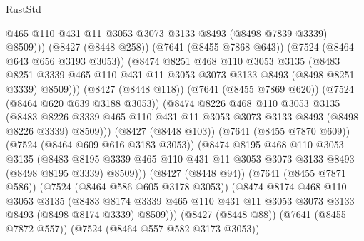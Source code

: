 \begin{lexlean}{RustStd}
\begin{coremodule}
{\begin{coremodule}
{{{{{{{{{{{{{{{{{{{{{{{{{{{{{{{{                      @465
                      @110
                      @431
                      @11
                      @3053
                      @3073
                      @3133
                      @8493
                      (@8498 @7839 @3339)
                      @8509)))
                (@8427 (@8448 @258))
                (@7641 (@8455 @7868 @643))
                (@7524 (@8464 @643 @656 @3193 @3053))
                (@8474
                  @8251
                  @468
                  @110
                  @3053
                  @3135
                  (@8483
                    @8251
                    @3339
                    @465
                    @110
                    @431
                    @11
                    @3053
                    @3073
                    @3133
                    @8493
                    (@8498 @8251 @3339)
                    @8509)))
              (@8427 (@8448 @118))
              (@7641 (@8455 @7869 @620))
              (@7524 (@8464 @620 @639 @3188 @3053))
              (@8474
                @8226
                @468
                @110
                @3053
                @3135
                (@8483
                  @8226
                  @3339
                  @465
                  @110
                  @431
                  @11
                  @3053
                  @3073
                  @3133
                  @8493
                  (@8498 @8226 @3339)
                  @8509)))
            (@8427 (@8448 @103))
            (@7641 (@8455 @7870 @609))
            (@7524 (@8464 @609 @616 @3183 @3053))
            (@8474
              @8195
              @468
              @110
              @3053
              @3135
              (@8483
                @8195
                @3339
                @465
                @110
                @431
                @11
                @3053
                @3073
                @3133
                @8493
                (@8498 @8195 @3339)
                @8509)))
          (@8427 (@8448 @94))
          (@7641 (@8455 @7871 @586))
          (@7524 (@8464 @586 @605 @3178 @3053))
          (@8474
            @8174
            @468
            @110
            @3053
            @3135
            (@8483
              @8174
              @3339
              @465
              @110
              @431
              @11
              @3053
              @3073
              @3133
              @8493
              (@8498 @8174 @3339)
              @8509)))
        (@8427 (@8448 @88))
        (@7641 (@8455 @7872 @557))
        (@7524 (@8464 @557 @582 @3173 @3053))
}}}}}}}}}}}}}}}}}}}}}}}}}}}}}}}}
\end{coremodule}}
\end{coremodule}
\end{lexlean}
